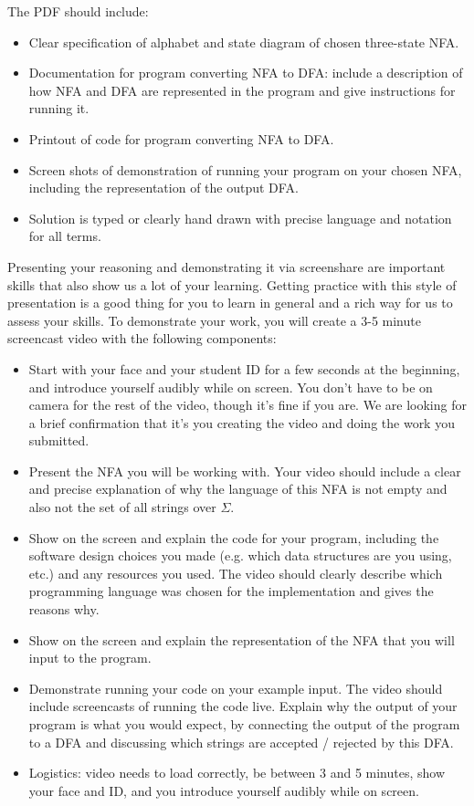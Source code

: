 The PDF should include: 
\begin{itemize}
   \item Clear specification of alphabet and state diagram of chosen three-state NFA.
   \item Documentation for program converting NFA to DFA: include a description of how NFA and DFA are 
   represented in the program and give instructions for running it.
   \item Printout of code for program converting NFA to DFA.
   \item Screen shots of demonstration of running your program on your chosen NFA, including the representation
   of the output DFA.
   \item Solution is typed or clearly hand drawn with precise language and notation for all terms.
\end{itemize}

Presenting your reasoning and demonstrating it via screenshare are important skills that also 
show us a lot of your learning. Getting practice with this style of presentation is a good thing 
for you to learn in general and a rich way for us to assess your skills. 
To demonstrate your work, you will create a 3-5 minute screencast video with the following components:

\begin{itemize}
\item Start with your face and your student ID for a few seconds at the beginning, 
and introduce yourself audibly while on screen. You don't have to be on camera for the 
rest of the video, though it's fine if you are. We are looking for a brief confirmation that 
it's you creating the video and doing the work you submitted.
\item Present the NFA you will be working with. Your video should include a clear and precise 
explanation of why the language of this NFA is not empty and also not the set of all strings over $\Sigma$.
\item Show on the screen and explain the code for your program, including the software design choices you made
(e.g. which data structures are you using, etc.) and any resources you used. The video 
should clearly describe which programming language was chosen 
for the implementation and gives the reasons why.
\item Show on the screen and explain the representation of the NFA that you will input to the program.
\item Demonstrate running your code on your example input. The video should include screencasts of 
running the code live.
Explain why the output of your program is what you would expect, by connecting the output of the 
program to a DFA and discussing which strings are accepted / rejected by this DFA.
\item Logistics: video needs to load correctly, be between 3 and 5 minutes, 
show your face and ID, and you introduce yourself 
audibly while on screen.
\end{itemize}

